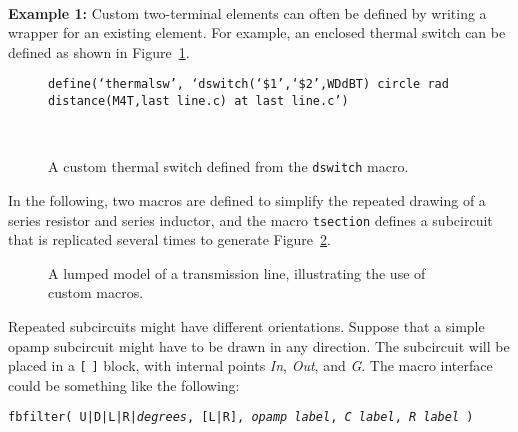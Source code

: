 \noindent\hbox{}\\ {\bf Example 1:}
Custom two-terminal elements can often be defined by writing a wrapper
for an existing element.  For example, an enclosed thermal switch
can be defined as shown in Figure~\ref{Thermal}.
\begin{figure}[hbt]
   \parbox{4in}{\tt define(`thermalsw',\hfill\break
   \hbox{}\space`dswitch(`\$1',`\$2',WDdBT)\hfill\break
   \hbox{}\space\space circle rad distance(M4T,last line.c) at last line.c') }%
   \hfill\raise-0.15in\hbox{ }
   \caption{A custom thermal switch defined from the {\tt dswitch} macro.}
   \label{Thermal}
   \end{figure}

In the following,
two macros are defined to simplify the repeated drawing
of a series resistor and series inductor, and the macro {\tt tsection} defines
a subcircuit that is replicated several times to generate Figure~\ref{Tline}.
{\small }
\begin{figure}[hbt]
   
   \caption{A lumped model of a transmission line, illustrating the
    use of custom macros.}
   \label{Tline}
   \end{figure}

{}
Repeated subcircuits might have different orientations.
Suppose that a simple opamp subcircuit might have to be drawn in any direction.
The subcircuit will be placed in a {\tt [} {\tt ]} block, with
internal points {\sl In}, {\sl Out}, and {\sl G}. 
The macro interface could be something like the following:

{\tt fbfilter( U|D|L|R|{\sl degrees}, [L|R], {\sl opamp label},
  {\sl C label}, {\sl R label} )}

